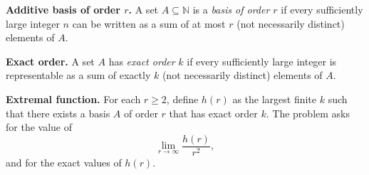 \medskip
\noindent\textbf{Additive basis of order $r$.}
A set $A\subseteq\mathbb{N}$ is a \emph{basis of order $r$} if every sufficiently large integer $n$ can be written as a sum of at most $r$ (not necessarily distinct) elements of $A$.

\medskip
\noindent\textbf{Exact order.}
A set $A$ has \emph{exact order} $k$ if every sufficiently large integer is representable as a sum of exactly $k$ (not necessarily distinct) elements of $A$.

\medskip
\noindent\textbf{Extremal function.}
For each $r\ge 2$, define $h(r)$ as the largest finite $k$ such that there exists a basis $A$ of order $r$ that has exact order $k$.
The problem asks for the value of
\[
\lim_{r\to\infty} \frac{h(r)}{r^2},
\]
and for the exact values of $h(r)$.
